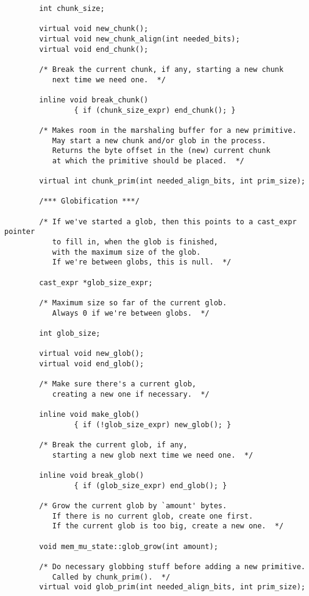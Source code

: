 \begin{verbatim}
        int chunk_size;

        virtual void new_chunk();
        virtual void new_chunk_align(int needed_bits);
        virtual void end_chunk();

        /* Break the current chunk, if any, starting a new chunk
           next time we need one.  */

        inline void break_chunk()
                { if (chunk_size_expr) end_chunk(); }

        /* Makes room in the marshaling buffer for a new primitive.
           May start a new chunk and/or glob in the process.
           Returns the byte offset in the (new) current chunk
           at which the primitive should be placed.  */

        virtual int chunk_prim(int needed_align_bits, int prim_size);

        /*** Globification ***/

        /* If we've started a glob, then this points to a cast_expr pointer
           to fill in, when the glob is finished,
           with the maximum size of the glob.
           If we're between globs, this is null.  */

        cast_expr *glob_size_expr;

        /* Maximum size so far of the current glob.
           Always 0 if we're between globs.  */

        int glob_size;

        virtual void new_glob();
        virtual void end_glob();

        /* Make sure there's a current glob,
           creating a new one if necessary.  */

        inline void make_glob()
                { if (!glob_size_expr) new_glob(); }

        /* Break the current glob, if any,
           starting a new glob next time we need one.  */

        inline void break_glob()
                { if (glob_size_expr) end_glob(); }

        /* Grow the current glob by `amount' bytes.
           If there is no current glob, create one first.
           If the current glob is too big, create a new one.  */

        void mem_mu_state::glob_grow(int amount);

        /* Do necessary globbing stuff before adding a new primitive.
           Called by chunk_prim().  */
        virtual void glob_prim(int needed_align_bits, int prim_size);


\end{verbatim}
